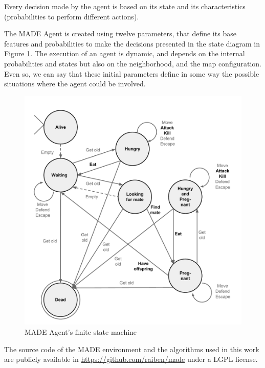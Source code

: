 \documentclass[letterpaper]{article}
\begin{document}
Every
decision made by the agent is based on its state and its
characteristics (probabilities to perform different actions). 





The MADE Agent is created using twelve parameters, that define its
base features and probabilities to make the decisions presented in the
state diagram in Figure \ref{fig:fsm}. The execution of an
agent is dynamic, and depends on the internal probabilities and states
but also on the neighborhood, and the map configuration. Even so, we
can say that these initial parameters define in some way the possible
situations where the agent could be involved.

\begin{figure}
\begin{center}
\includegraphics[scale=0.45]{img/fsm.pdf}
\caption{MADE Agent's finite state machine}
\label{fig:fsm}
\end{center}
\end{figure}



The source code of the MADE environment and the algorithms used in this work are publicly available in \url{https://github.com/raiben/made} under a LGPL license.
\end{document}
